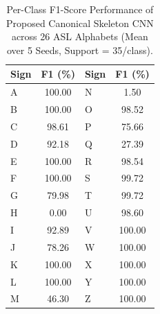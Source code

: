 \begin{table}[t]
\centering
\caption{Per-Class F1-Score Performance of Proposed Canonical Skeleton CNN across 26 ASL Alphabets (Mean over 5 Seeds, Support = 35/class).}
\label{tab:per_class}
\begin{tabular}{lc|lc}
\toprule
\textbf{Sign} & \textbf{F1 (\%)} & \textbf{Sign} & \textbf{F1 (\%)} \\
\midrule
A & 100.00 & N & 1.50 \\
B & 100.00 & O & 98.52 \\
C & 98.61 & P & 75.66 \\
D & 92.18 & Q & 27.39 \\
E & 100.00 & R & 98.54 \\
F & 100.00 & S & 99.72 \\
G & 79.98 & T & 99.72 \\
H & 0.00 & U & 98.60 \\
I & 92.89 & V & 100.00 \\
J & 78.26 & W & 100.00 \\
K & 100.00 & X & 100.00 \\
L & 100.00 & Y & 100.00 \\
M & 46.30 & Z & 100.00 \\
\bottomrule
\end{tabular}
\end{table}
